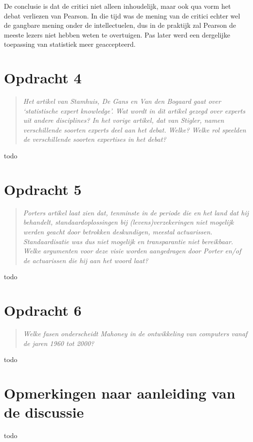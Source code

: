 \documentclass[a4paper,11pt]{article}
\begin{document}
De conclusie is dat de critici niet alleen inhoudelijk, maar ook qua vorm het
debat verliezen van Pearson. In die tijd was de mening van de critici echter
wel de gangbare mening onder de intellectuelen, dus in de praktijk zal Pearson
de meeste lezers niet hebben weten te overtuigen. Pas later werd een
dergelijke toepassing van statistiek meer geaccepteerd.


\section*{Opdracht 4}


\begin{quote}
\emph{Het artikel van Stamhuis, De Gans en Van den Bogaard gaat over
  `statistische expert knowledge'. Wat wordt in dit artikel gezegd over
  experts uit andere disciplines? In het vorige artikel, dat van Stigler,
  namen verschillende soorten experts deel aan het debat. Welke? Welke rol
  speelden de verschillende soorten expertises in het debat?}
\end{quote}


todo


\section*{Opdracht 5}


\begin{quote}
\emph{Porters artikel laat zien dat, tenminste in de periode die en het land
  dat hij behandelt, standaardoplossingen bij (levens)verzekeringen niet
  mogelijk werden geacht door betrokken deskundigen, meestal
  actuarissen. Standaardisatie was dus niet mogelijk en transparantie niet
  bereikbaar. Welke argumenten voor deze visie worden aangedragen door Porter
  en/of de actuarissen die hij aan het woord laat?}
\end{quote}


todo


\section*{Opdracht 6}


\begin{quote}
\emph{Welke fasen onderscheidt Mahoney in de ontwikkeling van computers vanaf
  de jaren 1960 tot 2000?}
\end{quote}


todo


\section*{Opmerkingen naar aanleiding van de discussie}


todo
\end{document}
